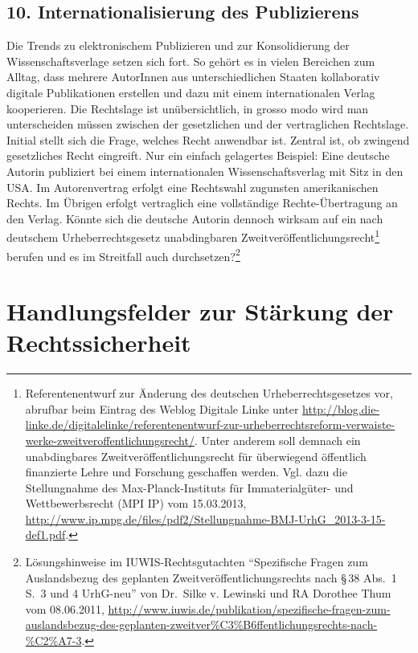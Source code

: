 \documentclass[output=paper]{langscibook}
\begin{document}
\hypertarget{internationalisierung-des-publizierens}{%
\subsection{10. Internationalisierung des
Publizierens}\label{internationalisierung-des-publizierens}}

Die Trends zu elektronischem Publizieren und zur Konsolidierung der
Wissenschaftsverlage setzen sich fort. So gehört es in vielen Bereichen
zum Alltag, dass mehrere AutorInnen aus unterschiedlichen Staaten
kollaborativ digitale Publikationen erstellen und dazu mit einem
internationalen Verlag kooperieren. Die Rechtslage ist unübersichtlich,
in grosso modo wird man unterscheiden müssen zwischen der gesetzlichen
und der vertraglichen Rechtslage. Initial stellt sich die Frage, welches
Recht anwendbar ist. Zentral ist, ob zwingend gesetzliches Recht
eingreift. Nur ein einfach gelagertes Beispiel: Eine deutsche Autorin
publiziert bei einem internationalen Wissenschaftsverlag mit Sitz in den
USA. Im Autorenvertrag erfolgt eine Rechtswahl zugunsten amerikanischen
Rechts. Im Übrigen erfolgt vertraglich eine vollständige
Rechte-Übertragung an den Verlag. Könnte sich die deutsche Autorin
dennoch wirksam auf ein nach deutschem Urheberrechtsgesetz unabdingbaren
Zweitveröffentlichungsrecht\footnote{Referentenentwurf zur Änderung des
  deutschen Urheberrechtsgesetzes vor, abrufbar beim Eintrag des Weblog
  Digitale Linke unter
  \url{http://blog.die-linke.de/digitalelinke/referentenentwurf-zur-urheberrechtsreform-verwaiste-werke-zweitveroffentlichungsrecht/}.
  Unter anderem soll demnach ein unabdingbares
  Zweitveröffentlichungsrecht für überwiegend öffentlich finanzierte
  Lehre und Forschung geschaffen werden. Vgl. dazu die Stellungnahme des
  Max-Planck-Instituts für Immaterialgüter- und Wettbewerbsrecht (MPI
  IP) vom 15.03.2013,
  \url{http://www.ip.mpg.de/files/pdf2/Stellungnahme-BMJ-UrhG_2013-3-15-def1.pdf}.}
berufen und es im Streitfall auch durchsetzen?\footnote{Lösungshinweise
  im IUWIS-Rechtsgutachten \enquote{Spezifische Fragen zum Auslandsbezug
  des geplanten Zweitveröffentlichungsrechts nach §\,38 Abs.~1 S.~3 und 4
  UrhG-neu} von Dr.~Silke v. Lewinski und RA Dorothee Thum vom
  08.06.2011,
  \url{http://www.iuwis.de/publikation/spezifische-fragen-zum-auslandsbezug-des-geplanten-zweitver\%C3\%B6ffentlichungsrechts-nach-\%C2\%A7-3}.}

\hypertarget{handlungsfelder-zur-stuxe4rkung-der-rechtssicherheit}{%
\section{Handlungsfelder zur Stärkung der
Rechtssicherheit}\label{handlungsfelder-zur-stuxe4rkung-der-rechtssicherheit}}
\end{document}
